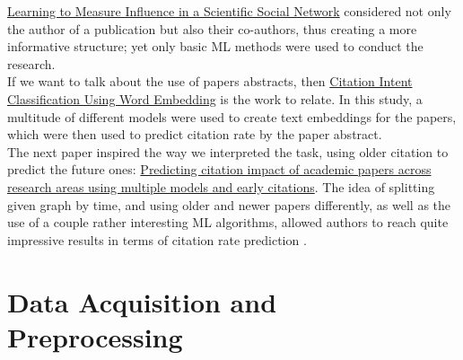 \documentclass{article}
\newcommand\tab[1][1cm]{\hspace*{#1}}
\begin{document}
\tab \href{https://link.springer.com/chapter/10.1007/978-3-319-06483-3_4?fromPaywallRec=true}{Learning to Measure Influence in a Scientific Social Network} considered not only the author of a publication but also their co-authors, thus creating a more informative structure; yet only basic ML methods were used to conduct the research.\\

\tab If we want to talk about the use of papers abstracts, then \href{https://www.researchgate.net/publication/348440299_Citation_Intent_Classification_Using_Word_Embedding}{Citation Intent Classification Using Word Embedding} is the work to relate. In this study, a multitude of different models were used to create text embeddings for the papers, which were then used to predict citation rate by the paper abstract.\\

\tab The next paper inspired the way we interpreted the task, using older citation to predict the future ones: \href{https://www.researchgate.net/publication/381695536_Predicting_citation_impact_of_academic_papers_across_research_areas_using_multiple_models_and_early_citations}{Predicting citation impact of academic papers across research areas using multiple models and early citations}. The idea of splitting given graph by time, and using older and newer papers differently, as well as the use of a couple rather interesting ML algorithms, allowed authors to reach quite impressive results in terms of citation rate prediction .\\
\section{Data Acquisition and Preprocessing}
\end{document}
